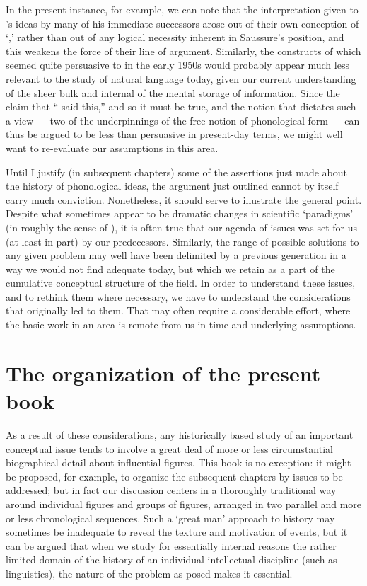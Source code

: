 In the present instance, for example, we can note that the
interpretation given to {\Saussure}'s ideas by many of his immediate
successors arose out of their own conception of `,'
rather than out of any logical necessity inherent in Saussure's
position, and this weakens the force of their line of argument.
Similarly, the constructs of  which seemed quite
persuasive to {\Jakobson} in the early 1950s would probably appear much
less relevant to the study of natural language today, given our
current understanding of the sheer bulk and internal  of the
mental storage of information.  Since the claim that ``{\Saussure} said
this,'' and so it must be true, and the notion that 
dictates such a view --- two of the underpinnings of the 
free notion of phonological form --- can thus be argued to be less
than persuasive in present-day terms, we might well want to
re-evaluate our assumptions in this area.

Until I justify (in subsequent chapters) some of the assertions just
made about the history of phonological ideas, the argument just
outlined cannot by itself carry much conviction.  Nonetheless, it
should serve to illustrate the general point.  Despite what sometimes
appear to be dramatic changes in scientific `para\-digms' (in roughly
the sense of \citealt{kuhn62:revolutions}), it is often true that our
agenda of issues was set for us (at least in part) by our
predecessors.  Similarly, the range of possible solutions to any given
problem may well have been delimited by a previous generation in a way
we would not find adequate today, but which we retain as a part of the
cumulative conceptual structure of the field.  In order to understand
these issues, and to rethink them where necessary, we have to
understand the considerations that originally led to them.  That may
often require a considerable effort, where the basic work in an area
is remote from us in time and underlying assumptions.

\section*{The organization of the present book}

As a result of these considerations, any historically based study of
an important conceptual issue tends to involve a great deal of
more or less circumstantial biographical detail about influential
figures. This book is no exception: it might be proposed, for example,
to organize the subsequent chapters by issues to be addressed; but in
fact our discussion centers in a thoroughly traditional way around
individual figures and groups of figures, arranged in two parallel and
more or less chronological sequences.  Such a `great man' approach to
history may sometimes be inadequate to reveal the texture and
motivation of events, but it can be argued that when we study for
essentially internal reasons the rather limited domain of the history
of an individual intellectual discipline (such as linguistics), the
nature of the problem as posed makes it essential.

